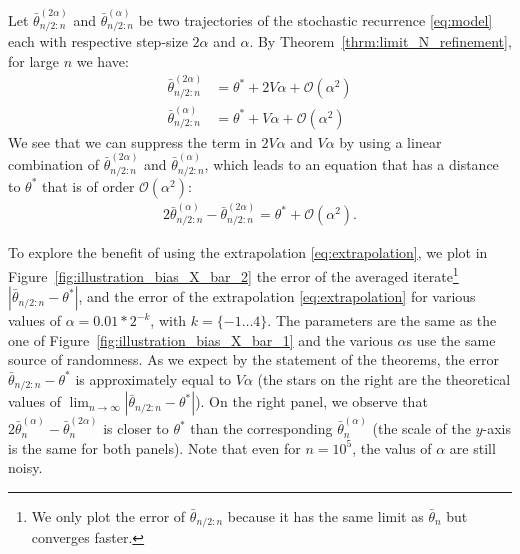 \documentclass{article}
\newcommand\abs[1]{\left|#1\right|}
\newcommand\bO[1]{\mathcal{O}(#1)}
\begin{document}
Let $\bar{\theta}_{n/2:n}^{(2\alpha)}$ and $\bar{\theta}_{n/2:n}^{(\alpha)}$ be two trajectories of the stochastic recurrence \eqref{eq:model} each with respective step-size $2\alpha$ and $\alpha$. By Theorem~\ref{thrm:limit_N_refinement}, for large $n$ we have: 
\begin{align*}
    \bar{\theta}_{n/2:n}^{(2\alpha)} &= \theta^* + 2V\alpha + \bO{\alpha^2}\\
    \bar{\theta}_{n/2:n}^{(\alpha)} &= \theta^* + V\alpha + \bO{\alpha^2}
\end{align*}
We see that we can suppress the term in $2V\alpha$ and $V\alpha$ by using a linear combination of $\bar{\theta}_{n/2:n}^{(2\alpha)}$ and $\bar{\theta}_{n/2:n}^{(\alpha)}$, which leads to an equation that has a distance to $\theta^*$ that is of order $\bO{\alpha^2}$:
\begin{align}
    \label{eq:extrapolation}
    2\bar{\theta}_{n/2:n}^{(\alpha)} - \bar{\theta}_{n/2:n}^{(2\alpha)} = \theta^* + \bO{\alpha^2}.
\end{align}



To explore the benefit of using the extrapolation \eqref{eq:extrapolation}, we plot in Figure~\ref{fig:illustration_bias_X_bar_2} the error of the averaged iterate\footnote{We only plot the error of $\bar{\theta}_{n/2:n}$ because it has the same limit as $\bar{\theta}_n$ but converges faster.} $\abs{\bar{\theta}_{n/2:n}-\theta^*}$, and the error of the extrapolation \eqref{eq:extrapolation} for various values of $\alpha=0.01*2^{-k}$, with $k=\{-1\dots 4\}$.  The parameters are the same as the one of Figure~\ref{fig:illustration_bias_X_bar_1} and the various $\alpha$s use the same source of randomness.  As we expect by the statement of the theorems, the error $\bar{\theta}_{n/2:n}-\theta^*$ is approximately equal to $V \alpha$ (the stars on the right are the theoretical values of $\lim_{n\to\infty}\abs{\bar{\theta}_{n/2:n}-\theta^*}$).  On the right panel, we observe that $2\bar{\theta}_n^{(\alpha)} - \bar{\theta}_n^{(2\alpha)}$ is closer to $\theta^*$ than the corresponding $\bar{\theta}_n^{(\alpha)}$ (the scale of the $y$-axis is the same for both panels). Note that even for $n=10^5$, the valus of $\alpha$ are still noisy.
\end{document}
